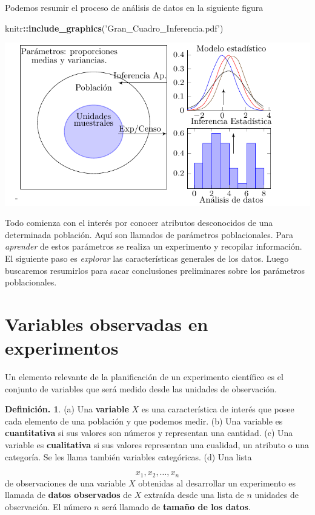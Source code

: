 \documentclass[]{book}
\newenvironment{Shaded}{\begin{snugshade}}{\end{snugshade}}
\newcommand{\KeywordTok}[1]{\textcolor[rgb]{0.13,0.29,0.53}{\textbf{#1}}}
\newcommand{\NormalTok}[1]{#1}
\newcommand{\OperatorTok}[1]{\textcolor[rgb]{0.81,0.36,0.00}{\textbf{#1}}}
\newcommand{\StringTok}[1]{\textcolor[rgb]{0.31,0.60,0.02}{#1}}
\theoremstyle{definition}
\newtheorem{definition}{Definición.}[chapter]
\theoremstyle{definition}
\theoremstyle{definition}
\theoremstyle{remark}
\begin{document}
Podemos resumir el proceso de análisis de datos en la
siguiente figura

\begin{Shaded}
\begin{Highlighting}[]
\NormalTok{knitr}\OperatorTok{::}\KeywordTok{include_graphics}\NormalTok{(}\StringTok{'Gran_Cuadro_Inferencia.pdf'}\NormalTok{)}
\end{Highlighting}
\end{Shaded}

\includegraphics{Gran_Cuadro_Inferencia.pdf}

Todo comienza con el interés por conocer atributos
desconocidos de una determinada población. Aquí
son llamados de parámetros poblacionales. Para \emph{aprender}
de estos parámetros se realiza un
experimento y recopilar información. El siguiente paso es
\emph{explorar} las características generales
de los datos. Luego buscaremos resumirlos para sacar
conclusiones preliminares sobre los
parámetros poblacionales.

\hypertarget{variables-observadas-en-experimentos}{%
\section{Variables observadas en experimentos}\label{variables-observadas-en-experimentos}}

Un elemento relevante de la planificación de un
experimento científico es el conjunto de variables que
será medido desde las unidades de observación.

\begin{definition}
\protect\hypertarget{def:unnamed-chunk-22}{}{\label{def:unnamed-chunk-22} }(a) Una \textbf{variable} \(X\) es una característica de interés
que posee cada elemento de una población
y que podemos medir. (b) Una variable es \textbf{cuantitativa}
si sus valores son números y representan
una cantidad. (c) Una variable es \textbf{cualitativa} si sus
valores representan una cualidad, un
atributo o una categoría. Se les llama también variables
categóricas. (d) Una lista

\[x_1, x_2, \ldots, x_n\]
de observaciones de una variable \(X\) obtenidas al
desarrollar un experimento es llamada de
\textbf{datos observados} de \(X\) extraída desde una lista
de \(n\) unidades de observación. El número \(n\)
será llamado de \textbf{tamaño de los datos}.
\end{definition}
\end{document}
